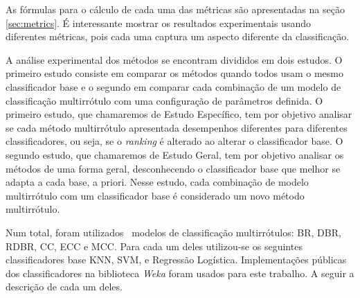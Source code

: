 As fórmulas para o cálculo de cada uma das métricas são apresentadas na seção \ref{sec:metrics}.
É interessante mostrar os resultados experimentais usando diferentes métricas, pois cada uma captura
um aspecto diferente da classificação. 

A análise experimental dos métodos se encontram divididos em dois estudos. O primeiro estudo consiste em
comparar os métodos quando todos usam o mesmo classificador base e o segundo em comparar cada combinação de um
modelo de classificação multirrótulo com uma configuração de parâmetros definida. 
O primeiro estudo, que chamaremos de Estudo Específico, tem por objetivo analisar se cada método multirrótulo apresentada desempenhos diferentes para
diferentes classificadores, ou seja, se o \textit{ranking} é alterado ao alterar o classificador base.
O segundo estudo, que chamaremos de Estudo Geral,
tem por objetivo analisar os métodos de uma forma geral,
desconhecendo o classificador base que melhor se adapta a cada base, a priori.
Nesse estudo, cada combinação de modelo multirrótulo com um classificador base é considerado
um novo método multirrótulo.

Num total, foram utilizados \Nml~modelos de classificação multirrótulos: BR, DBR, RDBR, CC, ECC e MCC.
Para cada um deles utilizou-se os seguintes classificadores base KNN, SVM, \jqo e Regressão Logística.
Implementações públicas dos classificadores na biblioteca \textit{Weka} \cite{weka} foram usados para este trabalho.
A seguir a descrição de cada um deles.

